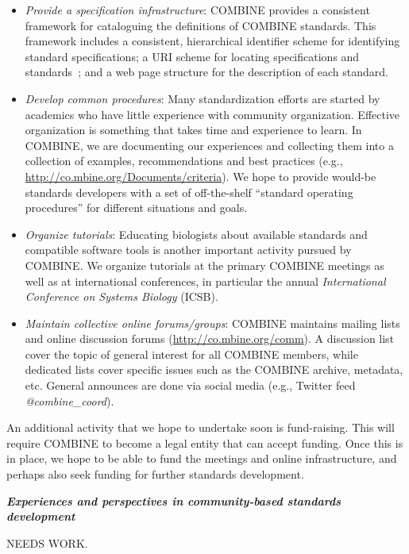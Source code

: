 \begin{itemize}
\item \emph{Provide a specification infrastructure}: COMBINE provides a consistent framework for cataloguing the definitions of COMBINE standards. This framework includes a consistent, hierarchical identifier scheme for identifying standard specifications; a URI scheme for locating specifications and standards~\cite[using Identifiers.org to provide permanent, resolvable URIs for standards;][]{Juty2012}; and a web page structure for the description of each standard.

\item \emph{Develop common procedures}: Many standardization efforts are started by academics who have little experience with community organization.  Effective organization is something that takes time and experience to learn.  In COMBINE, we are documenting our experiences and collecting them into a collection of examples, recommendations and best practices (e.g., \url{http://co.mbine.org/Documents/criteria}).  We hope to provide would-be standards developers with a set of off-the-shelf ``standard operating procedures'' for different situations and goals.

\item \emph{Organize tutorials}: Educating biologists about available standards and compatible software tools is another important activity pursued by COMBINE.  We organize tutorials at the primary COMBINE meetings as well as at international conferences, in particular the annual \emph{International Conference on Systems Biology} (ICSB).

\item \emph{Maintain collective online forums/groups}:  COMBINE maintains mailing lists and online discussion forums (\url{http://co.mbine.org/comm}).  A discussion list cover the topic of general interest for all COMBINE members, while dedicated lists cover specific issues such as the COMBINE archive, metadata, etc.  General announces are done via social media (e.g., Twitter feed \emph{@combine\_coord}).

\end{itemize}


An additional activity that we hope to undertake soon is fund-raising.  This will require COMBINE to become a legal entity that can accept funding.  Once this is in place, we hope to be able to fund the meetings and online infrastructure, and perhaps also seek funding for further standards development.


\clearpage
\textbf{\textsl{Experiences and perspectives in community-based standards development}}

NEEDS WORK.

